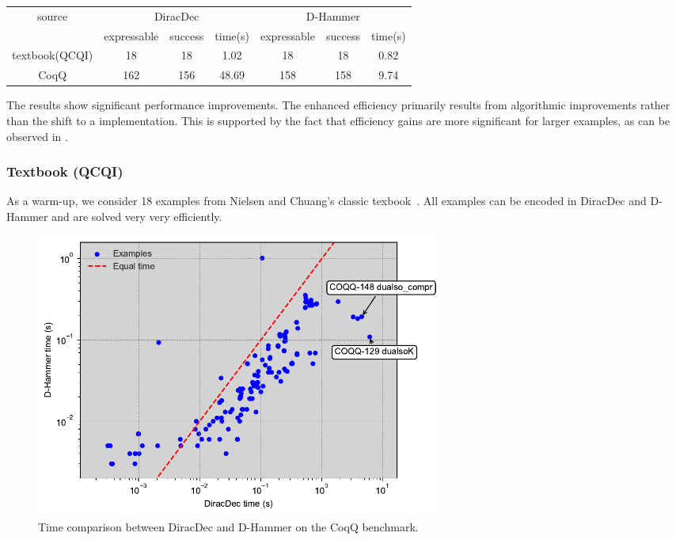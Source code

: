 \begin{center}
    \begin{tabular}{c|c c c|c c c}
        \hline
        \multirow{2}{*}{source} & \multicolumn{3}{c|}{DiracDec} & \multicolumn{3}{c}{D-Hammer} \\
        \cline{2-7}
                                 & expressable & success & time(s)           & expressable & success & time(s)                 \\
        \hline
        textbook(QCQI)          & 18          & 18        &    1.02        &    18      & 18          &   0.82      \\
        CoqQ                    & 162          & 156       &    48.69       &   158     &  158   &     9.74     \\
        \hline
    \end{tabular}        
\end{center}

The results show significant performance improvements. The enhanced
efficiency primarily results from algorithmic improvements rather than
the shift to a \CC implementation. This is supported by the fact that
efficiency gains are more significant for larger examples, as can be
observed in . 


\subsubsection{Textbook (QCQI)}
As a warm-up, we consider 18 examples from Nielsen and Chuang's
classic texbook~\cite{nielsen2010quantum}. All examples can be encoded
in DiracDec and D-Hammer and are solved very very efficiently.

\begin{figure}
    \centering
    \includegraphics[width=0.65\textwidth]{fig/coqq.pdf}
    \caption{Time comparison between DiracDec and D-Hammer on the CoqQ benchmark.}
    \label{fig: CoqQ plot}
    \vspace{-0.4cm}
\end{figure}


